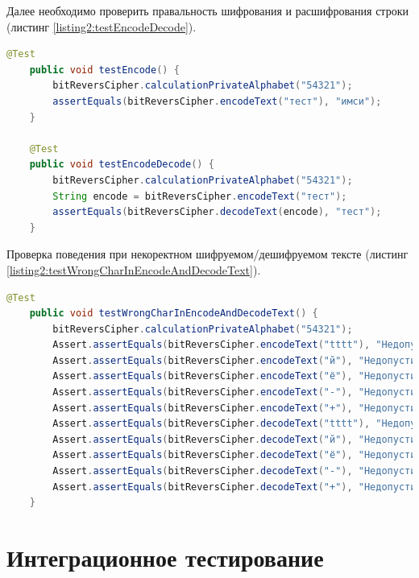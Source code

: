 \documentclass[a4paper,12pt]{article}
\begin{document}
Далее необходимо проверить правальность шифрования и расшифрования строки (листинг \ref{listing2:testEncodeDecode}).
\begin{lstlisting}[language=java, caption=метод calculationPrivateAlphabet, label=listing2:testEncodeDecode]
	@Test
    public void testEncode() {
        bitReversCipher.calculationPrivateAlphabet("54321");
        assertEquals(bitReversCipher.encodeText("тест"), "имси");
    }

    @Test
    public void testEncodeDecode() {
        bitReversCipher.calculationPrivateAlphabet("54321");
        String encode = bitReversCipher.encodeText("тест");
        assertEquals(bitReversCipher.decodeText(encode), "тест");
    }
\end{lstlisting}
Проверка поведения при некоректном шифруемом/дешифруемом тексте (листинг \ref{listing2:testWrongCharInEncodeAndDecodeText}).
\begin{lstlisting}[language=java, caption=метод calculationPrivateAlphabet, label=listing2:testWrongCharInEncodeAndDecodeText]
    @Test
    public void testWrongCharInEncodeAndDecodeText() {
        bitReversCipher.calculationPrivateAlphabet("54321");
        Assert.assertEquals(bitReversCipher.encodeText("tttt"), "Недопустимый символ. Шифрование не возможно");
        Assert.assertEquals(bitReversCipher.encodeText("й"), "Недопустимый символ. Шифрование не возможно");
        Assert.assertEquals(bitReversCipher.encodeText("ё"), "Недопустимый символ. Шифрование не возможно");
        Assert.assertEquals(bitReversCipher.encodeText("-"), "Недопустимый символ. Шифрование не возможно");
        Assert.assertEquals(bitReversCipher.encodeText("+"), "Недопустимый символ. Шифрование не возможно");
        Assert.assertEquals(bitReversCipher.decodeText("tttt"), "Недопустимый символ. Расшифровка не возможно");
        Assert.assertEquals(bitReversCipher.decodeText("й"), "Недопустимый символ. Расшифровка не возможно");
        Assert.assertEquals(bitReversCipher.decodeText("ё"), "Недопустимый символ. Расшифровка не возможно");
        Assert.assertEquals(bitReversCipher.decodeText("-"), "Недопустимый символ. Расшифровка не возможно");
        Assert.assertEquals(bitReversCipher.decodeText("+"), "Недопустимый символ. Расшифровка не возможно");
    }
\end{lstlisting}


\newpage \section{Интеграционное тестирование}
\end{document}

